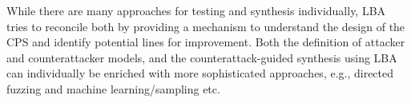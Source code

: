 {While there are many approaches for testing and synthesis individually, LBA tries to reconcile both by providing a mechanism to understand the design of the CPS and identify   potential lines for improvement. Both the definition of attacker and counterattacker models, and the counterattack-guided synthesis using LBA can individually be enriched with more sophisticated approaches, e.g., directed fuzzing and machine learning/sampling etc.




}
